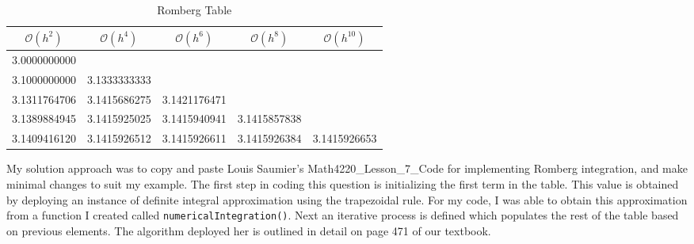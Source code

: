 \documentclass{article}
\begin{document}
\begin{enumerate}[label = {\arabic*}]
		
		
		\begin{table}[!h]
			\centering
			\begin{threeparttable}
				\caption{Romberg Table}
				\begin{tabular}{c c c c c}
					$\mathcal{O}(h^2)$ & $\mathcal{O}(h^4)$ & $\mathcal{O}(h^6)$ & $\mathcal{O}(h^8)$ & $\mathcal{O}(h^{10})$ \\
					\midrule
					\vspace{10pt}
					3.0000000000 & & & & \\
					\vspace{10pt}
					3.1000000000 & 3.1333333333 & & & \\
					\vspace{10pt}
					3.1311764706 & 3.1415686275 & 3.1421176471 & & \\
					\vspace{10pt}
					3.1389884945 & 3.1415925025 & 3.1415940941 & 3.1415857838 & \\
					\vspace{10pt}
					3.1409416120 & 3.1415926512 & 3.1415926611 & 3.1415926384 & 3.1415926653
				\end{tabular}
			\label{tb:table1}
			\end{threeparttable}
		\end{table}
		
		\hspace{15pt} My solution approach was to copy and paste Louis Saumier's Math4220\_Lesson\_7\_Code for implementing Romberg integration, and make minimal changes to suit my example. The first step in coding this question is initializing the first term in the table. This value is obtained by deploying an instance of definite integral approximation using the trapezoidal rule. For my code, I was able to obtain this approximation from a function I created called \texttt{numericalIntegration()}. Next an iterative process is defined which populates the rest of the table based on previous elements. The algorithm deployed her is outlined in detail on page 471 of our textbook.
		

\end{enumerate}
\end{document}

